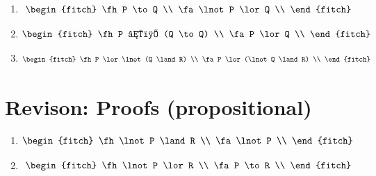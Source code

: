 \documentclass[12pt]{extarticle}
\begin{document}
\begin{multicols*}{3}
\begin{enumerate}
\item
 
\begin{equation*}
\begin{fitch}
\fh P \to Q \\
\fa \lnot P \lor Q \\
\end{fitch}
\end{equation*}
 
\item
 
\begin{equation*}
\begin{fitch}
\fh P ↔ (Q \to Q) \\
\fa P \lor Q \\
\end{fitch}
\end{equation*}
 
\item
 
\begin{equation*}
\begin{fitch}
\fh P \lor \lnot(Q \land R) \\
\fa P \lor (\lnot Q \land R) \\
\end{fitch}
\end{equation*}
 
\end{enumerate}
 
 
 
\section{Revison: Proofs (propositional)}
 
\begin{enumerate}
 
\item
 
\begin{equation*}
\begin{fitch}
\fh \lnot P \land R \\
\fa \lnot P \\
\end{fitch}
\end{equation*}
 
\item
 
\begin{equation*}
\begin{fitch}
\fh \lnot P \lor R \\
\fa P \to R \\
\end{fitch}
\end{equation*}
 

\end{enumerate}
\end{multicols*}
\end{document}
